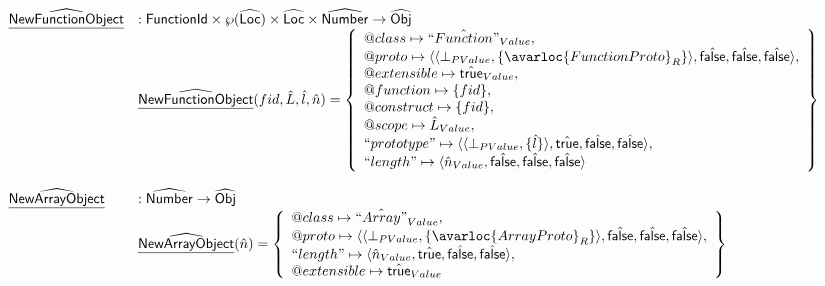 \[\begin{array}{ll}
\ahf{NewFunctionObject} & : \fid \times \powerset{\aLoc} \times \aLoc \times \abs{Number} \rightarrow \aObj \\
& \ahf{NewFunctionObject}(fid,\hat{L},\hat{l},\hat{n}) = \set{
  \varprop{class}\mapsto \hat{``Function"}_{Value},\\
  \varprop{proto}\mapsto
    \langle\langle\bot_{PValue},\{\avarloc{FunctionProto}_R\}\rangle,\afalse,\afalse,\afalse\rangle,\\
  \varprop{extensible}\mapsto \atrue_{Value},\\
  \varprop{function}\mapsto \{fid\},\\
  \varprop{construct}\mapsto \{fid\},\\
  \varprop{scope}\mapsto \hat{L}_{Value},\\
  ``prototype"\mapsto
    \langle\langle\bot_{PValue},\{\hat{l}\}\rangle,\atrue,\afalse,\afalse\rangle,\\
  ``length"\mapsto
    \langle\hat{n}_{Value},\afalse,\afalse,\afalse\rangle
}\\\\

\ahf{NewArrayObject} & : \abs{Number} \rightarrow \aObj \\
& \ahf{NewArrayObject}(\hat{n}) = \set{
    \varprop{class}\mapsto \hat{``Array"}_{Value},\\
    \varprop{proto}\mapsto 
    \langle\langle\bot_{PValue},\{\avarloc{ArrayProto}_R\}\rangle,\afalse,\afalse,\afalse\rangle,\\
   ``length"\mapsto
   \langle\hat{n}_{Value},\atrue,\afalse,\afalse\rangle,\\
  \varprop{extensible}\mapsto \atrue_{Value}
}\\\\
\end{array}
\]
